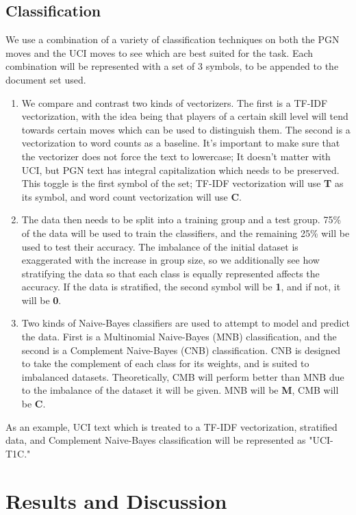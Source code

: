 \documentclass[conference]{IEEEtran}
\begin{document}
\subsection{Classification}
We use a combination of a variety of classification techniques on both the PGN moves and the UCI moves to see which are best suited for the task. Each combination will be represented with a set of 3 symbols, to be appended to the document set used.
\begin{enumerate}
\item We compare and contrast two kinds of vectorizers. The first is a TF-IDF vectorization, with the idea being that players of a certain skill level will tend towards certain moves which can be used to distinguish them. The second is a vectorization to word counts as a baseline. It's important to make sure that the vectorizer does not force the text to lowercase; It doesn't matter with UCI, but PGN text has integral capitalization which needs to be preserved. This toggle is the first symbol of the set; TF-IDF vectorization will use \textbf{T} as its symbol, and word count vectorization will use \textbf{C}.
\item The data then needs to be split into a training group and a test group. 75\% of the data will be used to train the classifiers, and the remaining 25\% will be used to test their accuracy. The imbalance of the initial dataset is exaggerated with the increase in group size, so we additionally see how stratifying the data so that each class is equally represented affects the accuracy. If the data is stratified, the second symbol will be \textbf{1}, and if not, it will be \textbf{0}.
\item Two kinds of Naive-Bayes classifiers are used to attempt to model and predict the data. First is a Multinomial Naive-Bayes (MNB) classification, and the second is a Complement Naive-Bayes (CNB) classification. CNB is designed to take the complement of each class for its weights, and is suited to imbalanced datasets. Theoretically, CMB will perform better than MNB due to the imbalance of the dataset it will be given. MNB will be \textbf{M}, CMB will be \textbf{C}.
\end{enumerate}

As an example, UCI text which is treated to a TF-IDF vectorization, stratified data, and Complement Naive-Bayes classification will be represented as "UCI-T1C."

\section{Results and Discussion}
\end{document}
